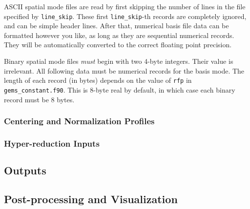 ASCII spatial mode files are read by first skipping the number of lines in the file specified by \verb|line_skip|. These first \verb|line_skip|-th records are completely ignored, and can be simple header lines. After that, numerical basis file data can be formatted however you like, as long as they are sequential numerical records. They will be automatically converted to the correct floating point precision.

Binary spatial mode files \textit{must} begin with two 4-byte integers. Their value is irrelevant. All following data must be numerical records for the basis mode. The length of each record (in bytes) depends on the value of \verb|rfp| in \verb|gems_constant.f90|. This is 8-byte real by default, in which case each binary record must be 8 bytes.

\subsubsection{Centering and Normalization Profiles}

\subsubsection{Hyper-reduction Inputs}

\subsection{Outputs}

\subsection{Post-processing and Visualization}

